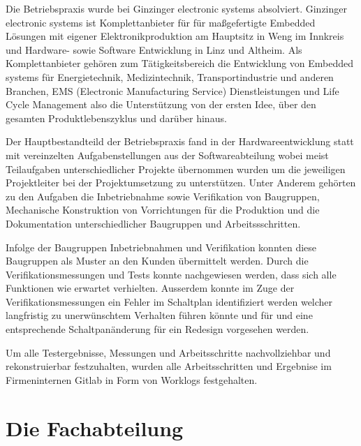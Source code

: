 \documentclass[praktikum,german]{hgbthesis}
\begin{document}
\color{black}

Die Betriebspraxis wurde bei Ginzinger electronic systems absolviert. 
Ginzinger electronic systems ist Komplettanbieter für für maßgefertigte Embedded Lösungen mit 
eigener Elektronikproduktion am Hauptsitz in Weng im Innkreis und Hardware- sowie Software 
Entwicklung in Linz und Altheim. Als Komplettanbieter gehören zum Tätigkeitsbereich
die Entwicklung von Embedded systems für Energietechnik, Medizintechnik, 
Transportindustrie und anderen Branchen, EMS (Electronic Manufacturing Service) Dienstleistungen und Life Cycle Management 
also die Unterstützung von der ersten Idee, über den gesamten Produktlebenszyklus und darüber hinaus.\cite{Ginzinger}

Der Hauptbestandteild der Betriebspraxis fand in der Hardwareentwicklung statt mit vereinzelten Aufgabenstellungen 
aus der Softwareabteilung wobei meist Teilaufgaben unterschiedlicher Projekte übernommen wurden um 
die jeweiligen Projektleiter bei der Projektumsetzung zu unterstützen. Unter Anderem gehörten zu den Aufgaben 
die Inbetriebnahme sowie Verifikation von Baugruppen, Mechanische Konstruktion von Vorrichtungen für die 
Produktion und die Dokumentation unterschiedlicher Baugruppen und Arbeitssschritten. 

Infolge der Baugruppen Inbetriebnahmen und Verifikation konnten diese Baugruppen 
als Muster an den Kunden übermittelt werden. Durch die Verifikationsmessungen und Tests
konnte nachgewiesen werden, dass sich alle Funktionen wie erwartet verhielten. Ausserdem konnte 
im Zuge der Verifikationsmessungen ein Fehler im Schaltplan identifiziert werden welcher 
langfristig zu unerwünschtem Verhalten führen könnte und für und eine entsprechende 
Schaltpanänderung für ein Redesign vorgesehen werden.

Um alle Testergebnisse, Messungen und Arbeitsschritte nachvollziehbar und rekonstruierbar festzuhalten,
wurden alle Arbeitsschritten und Ergebnise im Firmeninternen Gitlab in Form von 
Worklogs festgehalten.




\mainmatter           %

\chapter{Die Fachabteilung}
\end{document}

